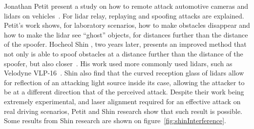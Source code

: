 Jonathan Petit \etal present a study on how to remote attack automotive cameras and \acp{lidar} on vehicles~\cite{Petit2015}. For \ac{lidar} relay, replaying and spoofing attacks are explained. Petit's work shows, for laboratory scenarios, how to make obstacles disappear and how to make the \ac{lidar} see ``ghost'' objects, for distances further than the distance of the spoofer. Hocheol Shin \etal, two years later, presents an improved method that not only is able to spoof obstacles at a distance further than the distance of the spoofer, but also closer~\cite{Shin2017}. His work used more commonly used \acp{lidar}, such as Velodyne VLP-16~\cite{vlp16}. Shin \etal also find that the curved reception glass of \acp{lidar} allow for reflection of an attacking light source inside its case, allowing the attacker to be at a different direction that of the perceived attack. Despite their work being extremely experimental, and laser alignment required for an effective attack on real driving scenarios, Petit \etal and Shin \etal research show that such result is possible. Some results from Shin research are shown on figure~\ref{fig:shinInterference}.


